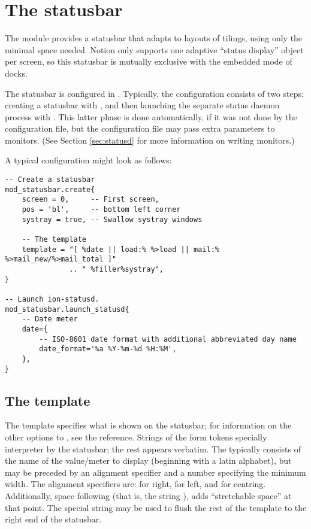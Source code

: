 \section{The statusbar}
\label{sec:statusbar}

The  module provides a statusbar that adapts to 
layouts of tilings, using only the minimal space needed. Notion only 
supports one adaptive ``status display'' object per screen, so this
statusbar is mutually exclusive with the embedded mode of  
docks. 

The statusbar is configured in . Typically,
the configuration consists of two steps: creating a statusbar with
, and then launching the separate
 status daemon process with 
. This latter phase is done
automatically, if it was not done by the configuration file, but
the configuration file may pass extra parameters to 
monitors. (See Section \ref{sec:statusd} for more information on
writing  monitors.)

A typical  configuration might look as follows:


\begin{verbatim}
-- Create a statusbar
mod_statusbar.create{
    screen = 0,     -- First screen, 
    pos = 'bl',     -- bottom left corner
    systray = true, -- Swallow systray windows

    -- The template
    template = "[ %date || load:% %>load || mail:% %>mail_new/%>mail_total ]"
               .. " %filler%systray",
}

-- Launch ion-statusd. 
mod_statusbar.launch_statusd{
    -- Date meter
    date={
        -- ISO-8601 date format with additional abbreviated day name
        date_format='%a %Y-%m-%d %H:%M',
    },      
}
\end{verbatim}


\subsection{The template}

The template specifies what is shown on the statusbar; for information
on the other options to , see the reference. 
Strings of the form  tokens specially interpreter by
the statusbar; the rest appears verbatim. The  typically
consists of the name of the value/meter to display (beginning with a latin
alphabet), but may be preceded by an alignment specifier and a number
specifying the minimum width. The alignment specifiers are: \codestr{>}
for right, \codestr{<} for left,  and \codestr{|} for centring. Additionally,
space following \codestr{\%} (that is, the string \codestr{\% }), adds
``stretchable space'' at that point. The special string 
may be used to flush the rest of the template to the right end of 
the statusbar. 

